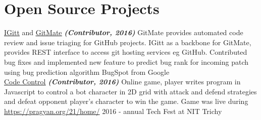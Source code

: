 \documentclass[]{deedy-resume-openfont}
\begin{document}
\begin{minipage}[t]{0.66\textwidth}
\section{Open Source Projects}
\textbullet{} \href{https://gitlab.com/gitmate/open-source/IGitt}{\underline {IGitt}} and \href{https://gitlab.com/gitmate/open-source/gitmate-2}{\underline {GitMate}} {\footnotesize \textit{\textbf{(Contributor, 2016) }}} \textemdash GitMate provides automated code review and issue triaging for GitHub projects. IGitt as a backbone for GitMate, provides REST interface to access git hosting services eg GitHub. Contributed bug fixes and implemented new feature to predict bug rank for incoming patch using bug prediction algorithm BugSpot from Google \\
\textbullet{} \href{https://github.com/ash7594/code-control/commits?author=tushar-rishav}{\underline {Code Control}} {\footnotesize \textit{\textbf{(Contributor, 2016) }}} \textemdash Online game, player writes program in Javascript to control a bot character in 2D grid with attack and defend strategies and defeat opponent player’s character to win the game. Game was live during \href{Pragyan}{https://pragyan.org/21/home/} 2016 - annual Tech Fest at NIT Trichy
\sectionsep

\end{minipage} 
\end{document}
